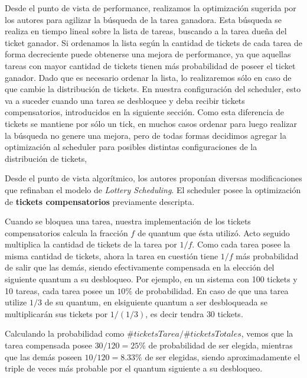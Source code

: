 Desde el punto de vista de performance, realizamos la optimizaci\'on sugerida por los autores para agilizar la b\'usqueda de la tarea ganadora. Esta b\'usqueda se realiza en tiempo lineal sobre la lista de tareas, buscando a la tarea due\~na del ticket ganador. Si ordenamos la lista seg\'un la cantidad de tickets de cada tarea de forma decreciente puede obtenerse una mejora de performance, ya que aquellas tareas con mayor cantidad de tickets tienen m\'as probabilidad de poseer el ticket ganador. Dado que es necesario ordenar la lista, lo realizaremos s\'olo en caso de que cambie la distribuci\'on de tickets. En nuestra configuraci\'on del scheduler, esto va a suceder cuando una tarea se desbloquee y deba recibir tickets compensatorios, introducidos en la siguiente secci\'on. Como esta diferencia de tickets se mantiene por s\'olo un tick, en muchos casos ordenar para luego realizar la b\'usqueda no genere una mejora, pero de todas formas decidimos agregar la optimizaci\'on al scheduler para posibles distintas configuraciones de la distribuci\'on de tickets,

\vspace{2mm}

Desde el punto de vista algor\'itmico, los autores propon\'ian diversas modificaciones que refinaban el modelo de \textit{Lottery Scheduling}. El scheduler posee la optimizaci\'on de \textbf{tickets compensatorios} previamente descripta.

\vspace{2mm}

Cuando se bloquea una tarea, nuestra implementaci\'on de los tickets compensatorios calcula la fracci\'on $f$ de quantum que \'esta utiliz\'o. Acto seguido multiplica la cantidad de tickets de la tarea por $1/f$. Como cada tarea posee la misma cantidad de tickets, ahora la tarea en cuesti\'on tiene $1/f$ m\'as probabilidad de salir que las dem\'as, siendo efectivamente compensada en la elecci\'on del siguiente quantum a su desbloqueo. Por ejemplo, en un sistema con 100 tickets y 10 tareas, cada tarea posee un $10\%$ de probabilidad. En caso de que una tarea utilize $1/3$ de su quantum, en elsiguiente quantum a ser desbloqueada se multiplicar\'an sus tickets por $1/(1/3)$, es decir tendra $30$ tickets.

\vspace{2mm}

Calculando la probabilidad como $\#ticketsTarea/\#ticketsTotales$, vemos que la tarea compensada posee $30/120 = 25\%$ de probabilidad de ser elegida, mientras que las dem\'as poseen $10/120 = 8.33\%$ de ser elegidas, siendo aproximadamente el triple de veces m\'as probable por el quantum siguiente a su desbloqueo.

